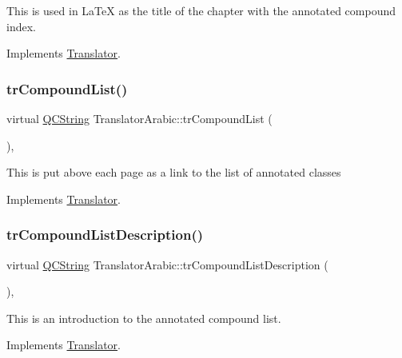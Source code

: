 This is used in La\+TeX as the title of the chapter with the annotated compound index. 

Implements \mbox{\hyperlink{class_translator}{Translator}}.

\mbox{\label{class_translator_arabic_a2bdcaaf56978992febf487f7721ca050}} 
\subsubsection{\texorpdfstring{trCompoundList()}{trCompoundList()}}
{\footnotesize\ttfamily virtual \mbox{\hyperlink{class_q_c_string}{Q\+C\+String}} Translator\+Arabic\+::tr\+Compound\+List (\begin{DoxyParamCaption}{ }\end{DoxyParamCaption})\hspace{0.3cm}{\ttfamily [inline]}, {\ttfamily [virtual]}}

This is put above each page as a link to the list of annotated classes 

Implements \mbox{\hyperlink{class_translator}{Translator}}.

\mbox{\label{class_translator_arabic_ada3a7c9f4dbbe8ba03053d7686e1355c}} 
\subsubsection{\texorpdfstring{trCompoundListDescription()}{trCompoundListDescription()}}
{\footnotesize\ttfamily virtual \mbox{\hyperlink{class_q_c_string}{Q\+C\+String}} Translator\+Arabic\+::tr\+Compound\+List\+Description (\begin{DoxyParamCaption}{ }\end{DoxyParamCaption})\hspace{0.3cm}{\ttfamily [inline]}, {\ttfamily [virtual]}}

This is an introduction to the annotated compound list. 

Implements \mbox{\hyperlink{class_translator}{Translator}}.

\mbox{\label{class_translator_arabic_a83e2c9dec5c0946efa2aae772d953b81}} 
